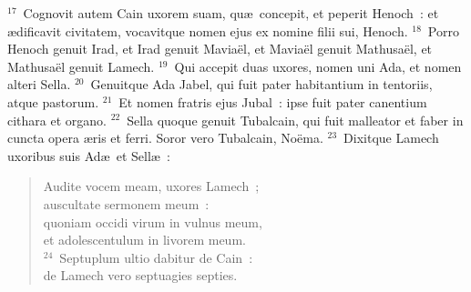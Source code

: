 ${}^{17}$~Cognovit autem Cain uxorem suam, qu\ae\ concepit, et peperit Henoch~: et \ae dificavit civitatem, vocavitque nomen ejus ex nomine filii sui, Henoch.
${}^{18}$~Porro Henoch genuit Irad, et Irad genuit Mavia\"el, et Mavia\"el genuit Mathusa\"el, et Mathusa\"el genuit Lamech.
${}^{19}$~Qui accepit duas uxores, nomen uni Ada, et nomen alteri Sella.
${}^{20}$~Genuitque Ada Jabel, qui fuit pater habitantium in tentoriis, atque pastorum.
${}^{21}$~Et nomen fratris ejus Jubal~: ipse fuit pater canentium cithara et organo.
${}^{22}$~Sella quoque genuit Tubalcain, qui fuit malleator et faber in cuncta opera \ae ris et ferri. Soror vero Tubalcain, No\"ema.
${}^{23}$~Dixitque Lamech uxoribus suis Ad\ae\ et Sell\ae~: \begin{flushleft}\begin{verse}Audite vocem meam, uxores Lamech~;\\ auscultate sermonem meum~:\\ quoniam occidi virum in vulnus meum,\\ et adolescentulum in livorem meum.\\
${}^{24}$~Septuplum ultio dabitur de Cain~:\\ de Lamech vero septuagies septies.\end{verse}\end{flushleft}


